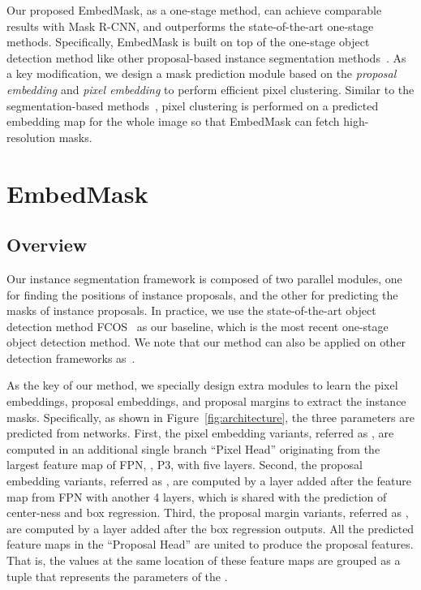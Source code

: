 \documentclass[10pt,twocolumn,letterpaper]{article}
\begin{document}
Our proposed EmbedMask, as a one-stage method, can achieve comparable results with Mask R-CNN, and outperforms the state-of-the-art one-stage methods. 
Specifically, EmbedMask is built on top of the one-stage object detection method like other proposal-based instance segmentation methods~\cite{chen2018masklab,he2017mask}. 
As a key modification, we design a mask prediction module based on the \emph{proposal embedding} and \emph{pixel embedding} to perform efficient pixel clustering. 
Similar to the segmentation-based methods~\cite{de2017semantic,neven2019instance}, pixel clustering is performed on a predicted embedding map for the whole image so that EmbedMask can fetch high-resolution masks. 

\section{EmbedMask}

\subsection{Overview}

Our instance segmentation framework is composed of two parallel modules, one for finding the positions of instance proposals, and the other for predicting the masks of instance proposals. 
In practice, we use the state-of-the-art object detection method FCOS~\cite{tian2019fcos} as our baseline, which is the most recent one-stage object detection method. We note that our method can also be applied on other detection frameworks as~\cite{lin2017focal,liu2016ssd,redmon2016you}.

As the key of our method, we specially design extra modules to learn the pixel embeddings, proposal embeddings, and proposal margins to extract the instance masks.
Specifically, as shown in Figure~\ref{fig:architecture}, the three parameters are predicted from networks. 
First, the pixel embedding variants, referred as , are computed in an additional single branch ``Pixel Head'' originating from the largest feature map of FPN, \ie, P3, with five  layers.
Second, the proposal embedding variants, referred as , are computed by a  layer added after the feature map from FPN with another 4  layers, which is shared with the prediction of center-ness and box regression.
Third, the proposal margin variants, referred as , are computed by a  layer added after the box regression outputs. 
All the predicted feature maps in the ``Proposal Head'' are united to produce the proposal features. That is, the values at the same location  of these feature maps are grouped as a tuple  that represents the parameters of the .
\end{document}
